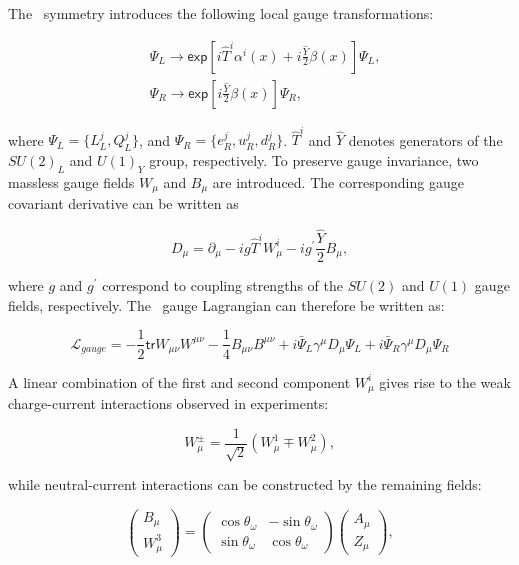 The \ew~symmetry introduces the following local gauge transformations:

\begin{equation}
\begin{split}
&\Psi_{L}\rightarrow\textsf{exp}[i\hat{T}^{i}\alpha^{i}(x)+i\frac{\hat{Y}}{2}\beta(x)]\Psi_{L},\\
&\Psi_{R}\rightarrow\textsf{exp}[i\frac{\hat{Y}}{2}\beta(x)]\Psi_{R},
\end{split}
\end{equation}

where $\Psi_{L}=\{L_{L}^{j},Q_{L}^{j}\}$, and $\Psi_{R}=\{e_{R}^{j}, u_{R}^{j}, d_{R}^{j}\}$. $\hat{T}^{i}$ and $\hat{Y}$ denotes generators of the $SU(2)_{L}$ and $U(1)_{Y}$ group, respectively. To preserve gauge invariance, two massless gauge fields $W_{\mu}$ and $B_{\mu}$ are introduced. The corresponding gauge covariant derivative can be written as

\begin{equation}
\label{eq:EWCov}
D_{\mu}=\partial_{\mu}-ig\hat{T}^{i}W_{\mu}^{i}-ig^{\prime}\frac{\hat{Y}}{2}B_{\mu},
\end{equation}

where $g$ and $g^{\prime}$ correspond to coupling strengths of the $SU(2)$ and $U(1)$ gauge fields, respectively. The \ew~gauge Lagrangian can therefore be written as:

\begin{equation}
\label{eq:LagGauge}
\mathcal{L}_{gauge}=-\frac{1}{2}\textsf{tr}W_{\mu\nu}W^{\mu\nu}-\frac{1}{4}B_{\mu\nu}B^{\mu\nu}+i\bar{\Psi}_{L}\gamma^{\mu}D_{\mu}\Psi_{L}+i\bar{\Psi}_{R}\gamma^{\mu}D_{\mu}\Psi_{R}
\end{equation}

A linear combination of the first and second component $W_{\mu}^{i}$ gives rise to the weak charge-current interactions observed in experiments:

\begin{equation}
\label{eq:CC}
W^{\pm}_{\mu}=\frac{1}{\sqrt{2}}(W^{1}_{\mu}\mp W^{2}_{\mu}),
\end{equation}

while neutral-current interactions can be constructed by the remaining fields:

\begin{equation}
\label{eq:NC}
\begin{pmatrix}B_{\mu}\\W_{\mu}^{3}\end{pmatrix}=\begin{pmatrix}\cos\theta_{\omega}&-\sin\theta_{\omega}\\\sin\theta_{\omega}&\cos\theta_{\omega}\end{pmatrix}\begin{pmatrix}A_{\mu}\\Z_{\mu}\end{pmatrix},
\end{equation}

